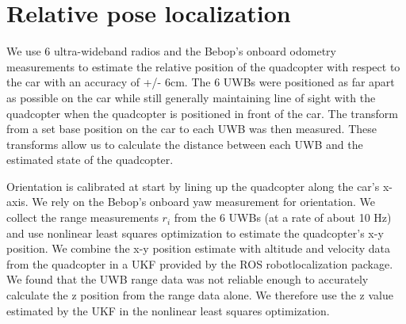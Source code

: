 
\section{Relative pose localization}

We use 6 ultra-wideband radios and the Bebop's onboard odometry measurements
to estimate the relative position of the quadcopter with respect to the car with an
accuracy of +/- 6cm. The 6 UWBs were positioned as far apart as possible on the
car while still generally maintaining line of sight with the quadcopter when the
quadcopter is positioned in front of the car. The transform from a set base position
on the car to each UWB was then measured. These transforms allow us to
calculate the distance between each UWB and the estimated state of the quadcopter.

Orientation is calibrated at start by lining up the quadcopter along the car's x-axis.
We rely on the Bebop's onboard yaw measurement for orientation.
We collect the range measurements $r_{i}$ from the 6 UWBs (at a rate of about 10 Hz)
and use nonlinear least squares optimization to estimate the quadcopter's x-y position. 
We combine the x-y position estimate with altitude and velocity data from the quadcopter in
a UKF provided by the ROS robot\textunderscore localization package.  We found that
the UWB range data was not reliable enough to accurately calculate the z position
from the range data alone. We therefore use the z value estimated by the UKF in
the nonlinear least squares optimization.